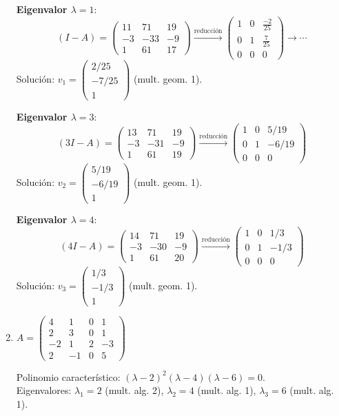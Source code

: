 \begin{prob}
\begin{enumerate}[$a)$]
\begin{myproof}
\textbf{Eigenvalor $\lambda=1$}:
\[
(I - A) = \begin{pmatrix}
11 & 71 & 19 \\
-3 & -33 & -9 \\
1 & 61 & 17
\end{pmatrix} \xrightarrow{\text{reducción}} \begin{pmatrix}
1 & 0 & \frac{-2}{25} \\
0 & 1 & \frac{7}{25} \\
0 & 0& 0
\end{pmatrix} \to \cdots
\]
Solución: $v_1 = \begin{pmatrix} 2/25 \\ -7/25 \\ 1 \end{pmatrix}$ (mult. geom. 1).

\textbf{Eigenvalor $\lambda=3$}:
\[
(3I - A) = \begin{pmatrix}
13 & 71 & 19 \\
-3 & -31 & -9 \\
1 & 61 & 19
\end{pmatrix} \xrightarrow{\text{reducción}} \begin{pmatrix}
1 & 0 & 5/19 \\
0 & 1 & -6/19 \\
0 & 0 & 0
\end{pmatrix}
\]
Solución: $v_2 = \begin{pmatrix} 5/19 \\ -6/19 \\ 1 \end{pmatrix}$ (mult. geom. 1).

\textbf{Eigenvalor $\lambda=4$}:
\[
(4I - A) = \begin{pmatrix}
14 & 71 & 19 \\
-3 & -30 & -9 \\
1 & 61 & 20
\end{pmatrix} \xrightarrow{\text{reducción}} \begin{pmatrix}
1 & 0 & 1/3 \\
0 & 1 & -1/3 \\
0 & 0 & 0
\end{pmatrix}
\]
Solución: $v_3 = \begin{pmatrix} 1/3 \\ -1/3 \\ 1 \end{pmatrix}$ (mult. geom. 1).
\end{myproof}

\item $A=\left(\begin{matrix}
4 & 1 & 0 & 1 \\
2 & 3 & 0 & 1 \\
-2 & 1 & 2 & -3 \\
2 & -1 & 0 & 5
\end{matrix}\right)$
\begin{myproof}
Polinomio característico: $(\lambda-2)^2(\lambda-4)(\lambda-6)=0$. \\
Eigenvalores: $\lambda_1=2$ (mult. alg. 2), $\lambda_2=4$ (mult. alg. 1), $\lambda_3=6$ (mult. alg. 1).


\end{myproof}
\end{enumerate}
\end{prob}
